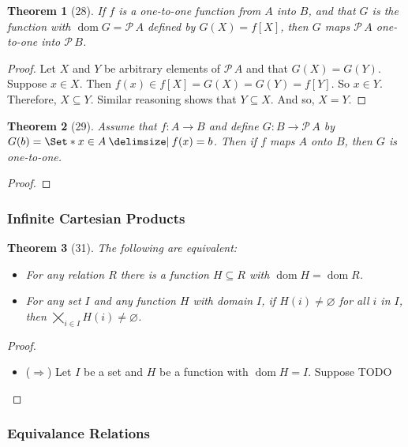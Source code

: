 \documentclass[12pt]{article}
\theoremstyle{plain}
\newtheorem*{exthm}{Theorem}
\theoremstyle{remark}
\theoremstyle{definition}
\theoremstyle{remark}
\newcommand{\powerset}{\mathscr{P}\,}
\providecommand\st{}
\newcommand\SetSymbol[1][]{%
  \nonscript\:#1\vert%
  \allowbreak%
  \nonscript\:
\mathopen{}}
\renewcommand\st{\SetSymbol[\delimsize]}
\DeclareMathOperator{\dom}{dom}
\begin{document}
\begin{exthm}[28]
  If $f$ is a one-to-one function from $A$ into $B$, and that $G$ is the function with $\dom{G} = \powerset{A}$ defined by $G(X) = f[X]$, then $G$ maps $\powerset{A}$ one-to-one into $\powerset{B}$.
\end{exthm}
\begin{proof}
  Let $X$ and $Y$ be arbitrary elements of $\powerset{A}$ and that $G(X) = G(Y)$. Suppose $x \in X$. Then $f(x) \in f[X] = G(X) = G(Y) = f[Y]$. So $x \in Y$. Therefore, $X \subseteq Y$. Similar reasoning shows that $Y \subseteq X$. And so, $X = Y$.
\end{proof}

\begin{exthm}[29]
  Assume that $f: A \rightarrow B$ and define $G: B \rightarrow \powerset{A}$ by $G(b) = \Set*{x \in A \st f(x) = b}$. Then if $f$ maps $A$ onto $B$, then $G$ is one-to-one.
\end{exthm}
\begin{proof}

\end{proof}

\subsubsection{Infinite Cartesian Products}

\begin{exthm}[31]
  The following are equivalent:
  \begin{itemize}
    \item For any relation $R$ there is a function $H \subseteq R$ with $\dom{H} = \dom{R}$.
    \item For any set $I$ and any function $H$ with domain $I$, if $H(i) \neq \varnothing$ for all $i$ in $I$, then $\bigtimes_{i \in I} H(i) \neq \varnothing$.
\end{itemize}
\end{exthm}
\begin{proof}
  \begin{itemize}
    \item ($\Rightarrow$) Let $I$ be a set and $H$ be a function with $\dom{H} = I$. Suppose
      TODO
  \end{itemize}
\end{proof}

\subsubsection{Equivalance Relations}
\end{document}
